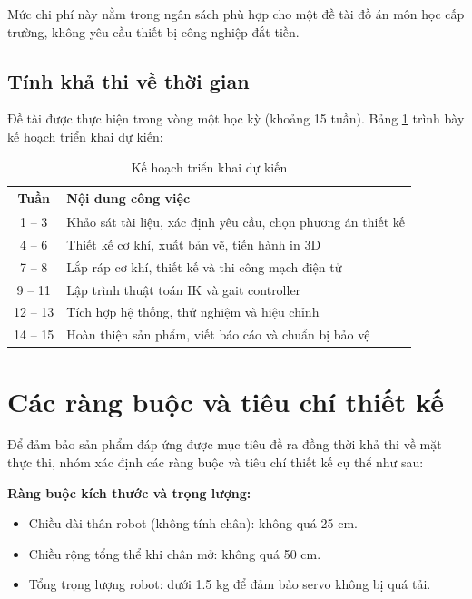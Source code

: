         Mức chi phí này nằm trong ngân sách phù hợp cho một đề tài đồ án môn học cấp trường, không yêu cầu thiết bị công nghiệp đắt tiền.

        \subsection{Tính khả thi về thời gian}

        \hspace{0.5cm} Đề tài được thực hiện trong vòng một học kỳ (khoảng 15 tuần). Bảng \ref{tab:timeline} trình bày kế hoạch triển khai dự kiến:

        \begin{table}[h!]
        \centering
        \caption{Kế hoạch triển khai dự kiến}
        \label{tab:timeline}
        \begin{tabular}{|c|l|}
        \hline
        \textbf{Tuần} & \textbf{Nội dung công việc} \\
        \hline
        1 -- 3 & Khảo sát tài liệu, xác định yêu cầu, chọn phương án thiết kế \\
        4 -- 6 & Thiết kế cơ khí, xuất bản vẽ, tiến hành in 3D \\
        7 -- 8 & Lắp ráp cơ khí, thiết kế và thi công mạch điện tử \\
        9 -- 11 & Lập trình thuật toán IK và gait controller \\
        12 -- 13 & Tích hợp hệ thống, thử nghiệm và hiệu chỉnh \\
        14 -- 15 & Hoàn thiện sản phẩm, viết báo cáo và chuẩn bị bảo vệ \\
        \hline
        \end{tabular}
        \end{table}

    \section{Các ràng buộc và tiêu chí thiết kế}

        \hspace{0.5cm} Để đảm bảo sản phẩm đáp ứng được mục tiêu đề ra đồng thời khả thi về mặt thực thi, nhóm xác định các ràng buộc và tiêu chí thiết kế cụ thể như sau:

        \textbf{Ràng buộc kích thước và trọng lượng:}
        \begin{itemize}
            \item Chiều dài thân robot (không tính chân): không quá 25 cm.
            \item Chiều rộng tổng thể khi chân mở: không quá 50 cm.
            \item Tổng trọng lượng robot: dưới 1.5 kg để đảm bảo servo không bị quá tải.
        \end{itemize}


